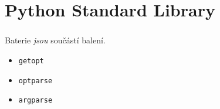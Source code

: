 \section{Python Standard Library}
\begin{frame}
\frametitle{\insertsection}

\begin{beamerboxesrounded}{}
\centering Baterie \textit{jsou} součástí balení.
\end{beamerboxesrounded}
\pause

\begin{itemize}

\item \alert<9>{\texttt{getopt}}
\pause

\item \texttt{optparse}
\pause

\item \alert<9-10>{\texttt{argparse}}
\end{itemize}

\begin{beamerboxesrounded}{}
\end{beamerboxesrounded}
\end{frame}





